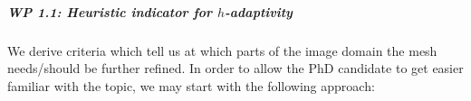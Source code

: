 \documentclass[enabledeprecatedfontcommands,cleardoublepage=empty,headsepline,twoside,11pt,DIV=15,BCOR=12mm,final]{scrartcl}
\begin{document}
 \subparagraph{WP 1.1: Heuristic indicator for $h$-adaptivity} We derive criteria which tell us at which parts of the image domain the mesh needs/should be further refined. In order to allow the PhD candidate to get easier familiar with the topic, we may start with the following approach:
\end{document}
